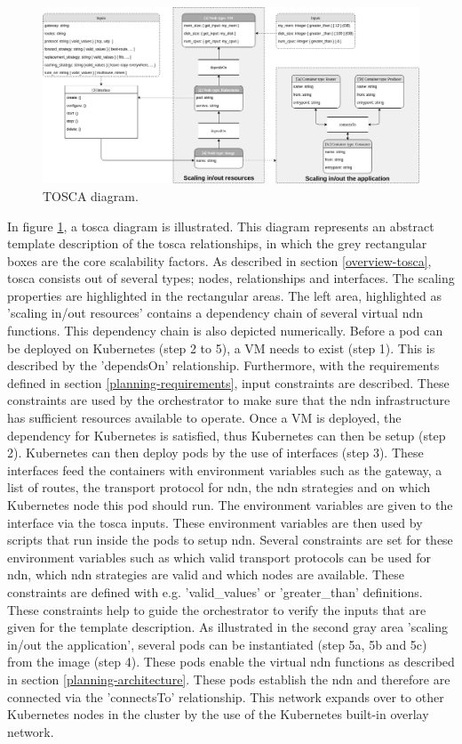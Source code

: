\begin{figure}[H]
\centering
\includegraphics[width=\columnwidth]{Images/tosca-diagram.png}
\caption{TOSCA diagram.}
\label{fig:tosca-diagram}
\end{figure}

In figure \ref{fig:tosca-diagram}, a \gls{tosca} diagram is illustrated. This diagram represents an abstract template description of the \gls{tosca} relationships, in which the grey rectangular boxes are the core scalability factors. As described in section \ref{overview-tosca}, \gls{tosca} consists out of several types; nodes, relationships and interfaces. The scaling properties are highlighted in the rectangular areas. The left area, highlighted as 'scaling in/out resources' contains a dependency chain of several virtual \gls{ndn} functions. This dependency chain is also depicted numerically. Before a pod can be deployed on Kubernetes (step 2 to 5), a VM needs to exist (step 1). This is described by the 'dependsOn' relationship. Furthermore, with the requirements defined in section \ref{planning-requirements}, input constraints are described. These constraints are used by the orchestrator to make sure that the \gls{ndn} infrastructure has sufficient resources available to operate. Once a VM is deployed, the dependency for Kubernetes is satisfied, thus Kubernetes can then be setup (step 2). Kubernetes can then deploy pods by the use of interfaces (step 3). These interfaces feed the containers with environment variables such as the gateway, a list of routes, the transport protocol for \gls{ndn}, the \gls{ndn} strategies and on which Kubernetes node this pod should run. The environment variables are given to the interface via the \gls{tosca} inputs. These environment variables are then used by scripts that run inside the pods to setup \gls{ndn}. Several constraints are set for these environment variables such as which valid transport protocols can be used for \gls{ndn}, which \gls{ndn} strategies are valid and which nodes are available. These constraints are defined with e.g. 'valid\_values' or 'greater\_than' definitions. These constraints help to guide the orchestrator to verify the inputs that are given for the template description. As illustrated in the second gray area 'scaling in/out the application', several pods can be instantiated (step 5a, 5b and 5c) from the image (step 4). These pods enable the virtual \gls{ndn} functions as described in section \ref{planning-architecture}. These pods establish the \gls{ndn} and therefore are connected via the 'connectsTo' relationship. This network expands over to other Kubernetes nodes in the cluster by the use of the Kubernetes built-in overlay network.

